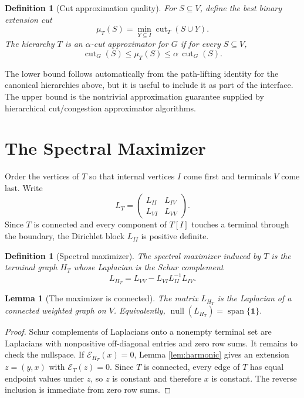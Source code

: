 \documentclass[11pt]{article}
\newtheorem{lemma}[theorem]{Lemma}
\newtheorem{definition}[theorem]{Definition}
\newcommand{\one}{\mathbf{1}}
\newcommand{\cut}{\operatorname{cut}}
\newcommand{\E}{\mathcal{E}}
\newcommand{\Null}{\operatorname{null}}
\begin{document}
\begin{definition}[Cut approximation quality]
\label{def:cut-approx}
For $S\subseteq V$, define the best binary extension cut
\[
  \mu_T(S)=\min_{Y\subseteq I}\cut_T(S\cup Y).
\]
The hierarchy $T$ is an $\alpha$-cut approximator for $G$ if for every
$S\subseteq V$,
\[
  \cut_G(S)\le \mu_T(S)\le \alpha\,\cut_G(S).
\]
\end{definition}

The lower bound follows automatically from the path-lifting identity for the
canonical hierarchies above, but it is useful to include it as part of the
interface.  The upper bound is the nontrivial approximation guarantee supplied
by hierarchical cut/congestion approximator algorithms.

\section{The Spectral Maximizer}

Order the vertices of $T$ so that internal vertices $I$ come first and
terminals $V$ come last.  Write
\[
  L_T=
  \begin{pmatrix}
    L_{II} & L_{IV}\\
    L_{VI} & L_{VV}
  \end{pmatrix}.
\]
Since $T$ is connected and every component of $T[I]$ touches a terminal
through the boundary, the Dirichlet block $L_{II}$ is positive definite.

\begin{definition}[Spectral maximizer]
\label{def:maximizer}
The spectral maximizer induced by $T$ is the terminal graph $H_T$ whose
Laplacian is the Schur complement
\[
  L_{H_T}=L_{VV}-L_{VI}L_{II}^{-1}L_{IV}.
\]
\end{definition}

\begin{lemma}[The maximizer is connected]
\label{lem:max-connected}
The matrix $L_{H_T}$ is the Laplacian of a connected weighted graph on $V$.
Equivalently, $\Null(L_{H_T})=\operatorname{span}\{\one\}$.
\end{lemma}

\begin{proof}
Schur complements of Laplacians onto a nonempty terminal set are Laplacians
with nonpositive off-diagonal entries and zero row sums.  It remains to check
the nullspace.  If $\E_{H_T}(x)=0$, Lemma \ref{lem:harmonic} gives an
extension $z=(y,x)$ with $\E_T(z)=0$.  Since $T$ is connected, every edge of
$T$ has equal endpoint values under $z$, so $z$ is constant and therefore
$x$ is constant.  The reverse inclusion is immediate from zero row sums.
\end{proof}
\end{document}
